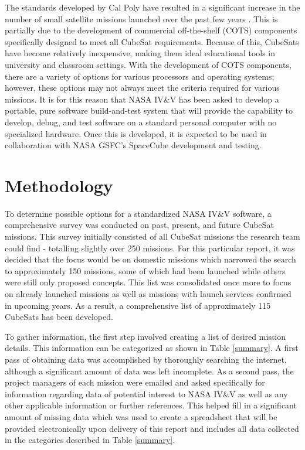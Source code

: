 \documentclass[11pt]{article}
\begin{document}
The standards developed by Cal Poly have resulted in a significant increase in the number of small satellite missions launched over the past few years \cite{MarketAssessment}.  This is partially due to the development of commercial off-the-shelf (COTS) components specifically designed to meet all CubeSat requirements.  Because of this, CubeSats have become relatively inexpensive, making them ideal educational tools in university and classroom settings.  With the development of COTS components, there are a variety of options for various processors and operating systems; however, these options may not always meet the criteria required for various missions.  It is for this reason that NASA IV\&V has been asked to develop a portable, pure software build-and-test system that will provide the capability to develop, debug, and test software on a standard personal computer with no specialized hardware.  Once this is developed, it is expected to be used in collaboration with NASA GSFC's SpaceCube development and testing. 

\section{Methodology}
To determine possible options for a standardized NASA IV\&V software, a comprehensive survey was conducted on past, present, and future CubeSat missions.  This survey initially consisted of all CubeSat missions the research team could find - totalling slightly over 250 missions.  For this particular report, it was decided that the focus would be on domestic missions which narrowed the search to approximately 150 missions, some of which had been launched while others were still only proposed concepts.  This list was consolidated once more to focus on already launched missions as well as missions with launch services confirmed in upcoming years.  
As a result, a comprehensive list of approximately 115 CubeSats has been developed.  

To gather information, the first step involved creating a list of desired mission details.  This information can be categorized as shown in Table \ref{summary}.  A first pass of obtaining data was accomplished by thoroughly searching the internet, although a significant amount of data was left incomplete.  As a second pass, the project managers of each mission were emailed and asked specifically for information regarding data of potential interest to NASA IV\&V as well as any other applicable information or further references.  This helped fill in a significant amount of missing data which was used to create a spreadsheet that will be provided electronically upon delivery of this report and includes all data collected in the categories described in Table \ref{summary}.
\end{document}

